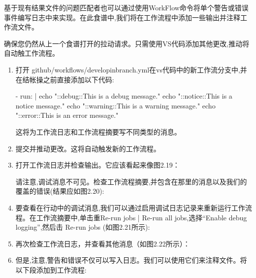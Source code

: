 
基于现有结果文件的问题匹配者也可以通过使用WorkFlow命令将单个警告或错误事件编写日志中来实现。在此食谱中,我们将在工作流程中添加一些输出并注释工作流文件。


确保您仍然从上一个食谱打开的拉动请求。只需使用VS代码添加其他更改,推动将自动触工作流程。


\begin{enumerate}
\item 
打开 github/workflows/developinbranch.yml在vs代码中的新工作流分支中,并在结帐操之前直接添加以下代码:

\begin{shell}
- run: |
  echo "::debug::This is a debug message."
  echo "::notice::This is a notice message."
  echo "::warning::This is a warning message."
  echo "::error::This is an error message."
\end{shell}

这将为工作流日志和工作流程摘要写不同类型的消息。

\item 
提交并推动更改。这将自动触发新的工作流程。

\item 
打开工作流日志并检查输出。它应该看起来像图2.19：


请注意,调试消息不可见。检查工作流程摘要,并包含在那里的消息以及我们的覆盖的错误(结果应如图2.20):


\item 
要查看在行动中的调试消息,我们可以通过启用调试日志记录来重新运行工作流程。在工作流摘要中,单击重Re-run jobs | Re-run all jobs,选择“Enable debug logging”,然后击 Re-run jobs (如图2.21所示):


\item 
再次检查工作流日志，并查看其他消息（如图2.22所示）：


\item 
但是,注意,警告和错误不仅可以写入日志。我们可以使用它们来注释文件。将以下段添加到工作流程:


\end{enumerate}
